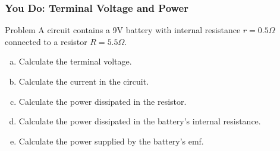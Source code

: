 \documentclass{beamer}
\begin{document}
\begin{frame}
    \frametitle{You Do: Terminal Voltage and Power}
    \begin{block}{Problem}
        A circuit contains a 9V battery with internal resistance $r = 0.5\Omega$ connected to a resistor $R = 5.5\Omega$.
        \begin{enumerate}[(a)]
            \item Calculate the terminal voltage.
            \item Calculate the current in the circuit.
            \item Calculate the power dissipated in the resistor.
            \item Calculate the power dissipated in the battery's internal resistance.
            \item Calculate the power supplied by the battery's emf.
        \end{enumerate}
    \end{block}
    \end{frame}

\end{document}
